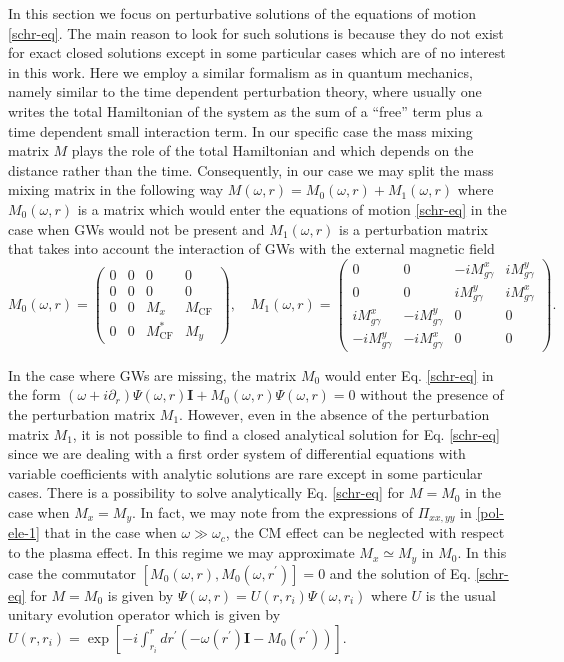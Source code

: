 \documentclass[a4paper,11pt]{article}
\newcommand{\bs}{\boldsymbol}
\begin{document}
 
In this section we focus on perturbative solutions of the equations of motion \eqref{schr-eq}. The main reason to look for such solutions is because they do not exist for exact closed solutions except in some particular cases which are of no interest in this work. Here we employ a similar formalism as in quantum mechanics, namely similar to the time dependent perturbation theory, where usually one writes the total Hamiltonian of the system as the sum of a ``free'' term plus a time dependent small interaction term. In our specific case the mass mixing matrix $M$ plays the role of the total Hamiltonian and which depends on the distance rather than the time. Consequently, in our case we may split the mass mixing matrix in the following way $M(\omega, r)=M_0(\omega, r)+M_1(\omega, r)$ where $M_0(\omega, r)$ is a matrix which would enter the equations of motion \eqref{schr-eq} in the case when GWs would not be present and $M_1(\omega, r)$ is a perturbation matrix that takes into account the interaction of GWs with the external magnetic field
\begin{equation}
M_0(\omega, r)=\begin{pmatrix}
0 & 0 & 0 & 0 \\
0 & 0 & 0 & 0 \\
0 & 0 & M_x & M_\text{CF} \\
0 & 0 & M_\text{CF}^* & M_y
   \end{pmatrix}, \quad
M_1(\omega, r)=\begin{pmatrix}
0 & 0 & -iM_{g\gamma}^x & iM_{g\gamma}^y \\
0 & 0 & iM_{g\gamma}^y & iM_{g\gamma}^x \\
iM_{g\gamma}^x & -iM_{g\gamma}^y & 0 & 0 \\
-iM_{g\gamma}^y & -iM_{g\gamma}^x & 0 & 0
   \end{pmatrix}.
      \end{equation}


In the case where GWs are missing, the matrix $M_0$ would enter Eq. \eqref{schr-eq} in the form $\left(\omega + i\partial_r\right)\Psi(\omega, r)\bs I+M_0(\omega, r)\Psi(\omega, r)=0$ without the presence of the perturbation matrix $M_1$. However, even in the absence of the perturbation matrix $M_1$, it is not possible to find a closed analytical solution for Eq. \eqref{schr-eq} since we are dealing with a first order system of differential equations with variable coefficients with analytic solutions are rare except in some particular cases. There is a possibility to solve analytically Eq. \eqref{schr-eq} for $M=M_0$ in the case when $M_x=M_y$. In fact, we may note from the expressions of $\Pi_{xx, yy}$ in \eqref{pol-ele-1} that in the case when $\omega \gg \omega_c$, the CM effect can be neglected with respect to the plasma effect. In this regime we may approximate $M_x\simeq M_y$ in $M_0$. In this case the commutator $[M_0(\omega, r), M_0(\omega, r^\prime)]=0$ and the solution of Eq. \eqref{schr-eq} for $M=M_0$ is given by $\Psi(\omega, r)=U(r, r_i)\Psi(\omega, r_i)$ where $U$ is the usual unitary evolution operator which is given by $U(r, r_i)=\exp[-i\int_{r_i}^r dr^\prime \left(-\omega(r^\prime)\bs I- M_0(r^\prime)\right)]$.
\end{document}
